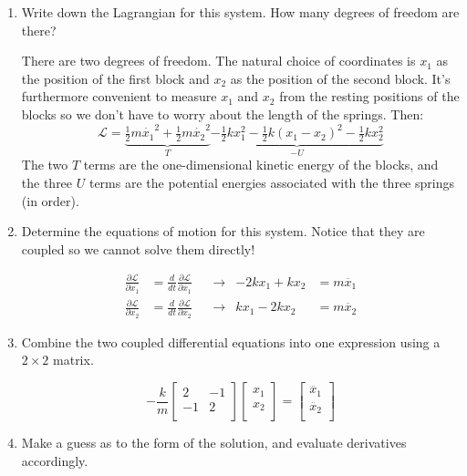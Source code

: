 \documentclass[12pt]{article}
\newcommand{\purple}[1]{{\color{purple} #1}}
\begin{document}
\begin{enumerate}
\item Write down the Lagrangian for this system. How many degrees of freedom are there?

\purple{
There are two degrees of freedom. The natural choice of coordinates is $x_1$ as the position of the first block and $x_2$ as the position of the second block. It's furthermore convenient to measure $x_1$ and $x_2$ from the resting positions of the blocks so we don't have to worry about the length of the springs. Then:
$$
\mathcal{L} = 
\underbrace{
\tfrac{1}{2} m \dot{x_1}^2 + \tfrac{1}{2} m \dot{x_2}^2
}_{T}
\underbrace{
- \tfrac{1}{2} k x_1^2 - \tfrac{1}{2} k \left( x_1 - x_2 \right)^2 - \tfrac{1}{2} k x_2^2
}_{-U}
$$
The two $T$ terms are the one-dimensional kinetic energy of the blocks, and the three $U$ terms are the potential energies associated with the three springs (in order).}
\item Determine the equations of motion for this system. Notice that they are coupled so we cannot solve them directly!

\purple{
\begin{align*}
\frac{\partial \mathcal{L}}{\partial x_1} &= \frac{d}{dt} \frac{\partial \mathcal{L}}{\partial \dot{x_1}}
& &\rightarrow&
-2kx_1 + kx_2 &= m\ddot{x_1} \\
\frac{\partial \mathcal{L}}{\partial x_2} &= \frac{d}{dt} \frac{\partial \mathcal{L}}{\partial \dot{x_2}}
& &\rightarrow&
kx_1 -2kx_2 &= m\ddot{x_2}
\end{align*}
}
\item Combine the two coupled differential equations into one expression using a $2\times2$ matrix.

\purple{
$$
-\frac{k}{m}
\left[
{\begin{array}{cc}
   2 & -1\\
   -1 & 2\\
  \end{array} }
\right]
\left[
{\begin{array}{c}
   x_1\\
   x_2\\
  \end{array} }
\right] = 
\left[
{\begin{array}{c}
   \ddot{x_1}\\
   \ddot{x_2}\\
  \end{array} }
\right]
$$
}
\item Make a guess as to the form of the solution, and evaluate derivatives accordingly.


\end{enumerate}
\end{document}
